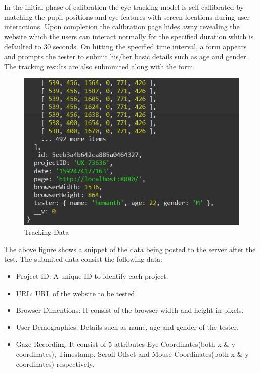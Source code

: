 \documentclass[hidelinks,12pt,a4paper,final]{extreport}
\begin{document}
In the initial phase of calibration the eye tracking model is self callibrated by matching the pupil positions and eye features with screen locations during user interactions.
Upon completion the calibration page hides away revealing the website which the users can interact normally for the specified duration which is defaulted to 30 seconds. On hitting the specified time interval, a form appears and prompts the tester to submit his/her basic details such as age and gender. The tracking results are also submmited along with the form.
\begin{figure}[H]
    \centering
    \includegraphics[width=\linewidth]{tracking-data.png}
    \caption{Tracking Data}
\end{figure}

The above figure shows a snippet of the data being posted to the server after the test.
The submited data consist the following data:
\begin{itemize}
	\item Project ID: A unique ID to identify each project.
	\item URL: URL of the website to be tested.
	\item Browser Dimentions: It consist of the browser width and height in pixels.
	\item User Demographics: Details such as name, age and gender of the tester.
	\item Gaze-Recording: It consist of 5 attributes-Eye Coordinates(both x \& y coordinates), Timestamp, Scroll Offset and Mouse Coordinates(both x \& y coordinates) respectively.
\end{itemize}
\end{document}

